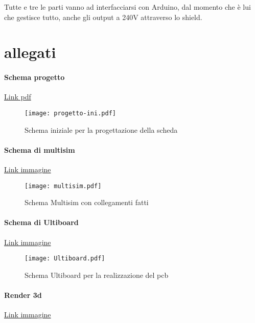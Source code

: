 \documentclass[12pt]{article}
\begin{document}
\noindent
Tutte e tre le parti vanno ad interfacciarsi con Arduino, dal momento che è lui che gestisce tutto, anche gli output a 240V attraverso lo shield.\\

\vfill
\section{allegati} 
\label{sec:allegati}
\paragraph{Schema progetto}
\href{https://drive.google.com/file/d/1qK_MUvGxWjfc9fLc7l3a6s5mL5L6D6fg/view?usp=sharing}{Link pdf}
\begin{figure}[H]
   \centering
        \texttt{[image: progetto-ini.pdf]}
       \label{prog}
       \caption{Schema iniziale per la progettazione della scheda}
\end{figure}
\vfill
\paragraph{Schema di multisim}
\href{https://drive.google.com/file/d/1VOPnspiu-4T2ZOR6uaUWNH1DUEd0fUcg/view?usp=sharing}{Link immagine}
\begin{figure}[H]
   \centering
        \texttt{[image: multisim.pdf]}
       \label{multisim}
       \caption{Schema Multisim con collegamenti fatti}
\end{figure}
\vfill
\paragraph{Schema di Ultiboard}
\href{https://drive.google.com/file/d/1ZlJ_AIXvgzdlvAawX5noBu48i03zm5dP/view?usp=sharing}{Link immagine}
\begin{figure}[H]
    \centering
        \texttt{[image: Ultiboard.pdf]}
        \label{ultiabroad}
        \caption{Schema Ultiboard per la realizzazione del pcb}
\end{figure}
\vskip 2cm
\vfill
\paragraph{Render 3d}
\href{https://drive.google.com/file/d/1EMIzjUSU50ij58dLTjCctJGQM4YIgIii/view?usp=sharing}{Link immagine}
\end{document}
